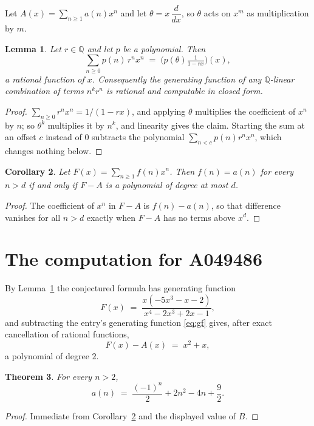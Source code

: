 \documentclass[11pt,a4paper]{article}
\theoremstyle{plain}
\newtheorem{theorem}{Theorem}
\newtheorem{lemma}[theorem]{Lemma}
\newtheorem{corollary}[theorem]{Corollary}
\theoremstyle{definition}
\begin{document}
Let $A(x)=\sum_{n\ge 1}a(n)x^{n}$ and let $\theta=x\,\dfrac{d}{dx}$, so $\theta$
acts on $x^{m}$ as multiplication by $m$.

\begin{lemma}\label{lem:gf}
Let $r\in\mathbb{Q}$ and let $p$ be a polynomial. Then
\[
\sum_{n\ge0}p(n)\,r^{n}x^{n}\;=\;\bigl(p(\theta)\tfrac{1}{1-rx}\bigr)(x),
\]
a rational function of $x$. Consequently the generating function of any
$\mathbb{Q}$-linear combination of terms $n^{k}r^{n}$ is rational and computable in
closed form.
\end{lemma}

\begin{proof}
$\sum_{n\ge0}r^{n}x^{n}=1/(1-rx)$, and applying $\theta$ multiplies the coefficient of
$x^{n}$ by $n$; so $\theta^{k}$ multiplies it by $n^{k}$, and linearity gives the claim.
Starting the sum at an offset $c$ instead of $0$ subtracts the polynomial
$\sum_{n<c}p(n)r^{n}x^{n}$, which changes nothing below.
\end{proof}

\begin{corollary}\label{cor:criterion}
Let $F(x)=\sum_{n\ge 1}f(n)x^{n}$. Then $f(n)=a(n)$ for every $n>d$ if and only
if $F-A$ is a polynomial of degree at most $d$.
\end{corollary}

\begin{proof}
The coefficient of $x^{n}$ in $F-A$ is $f(n)-a(n)$, so that difference vanishes for all
$n>d$ exactly when $F-A$ has no terms above $x^{d}$.
\end{proof}

\section{The computation for A049486}

By Lemma~\ref{lem:gf} the conjectured formula has generating function
\[
F(x)\;=\;\frac{x \left(- 5 x^{3} - x - 2\right)}{x^{4} - 2 x^{3} + 2 x - 1} ,
\]
and subtracting the entry's generating function \eqref{eq:gf} gives, after exact
cancellation of rational functions,
\[
F(x)-A(x)\;=\;x^{2} + x ,
\]
a polynomial of degree $2$.

\begin{theorem}
For every $n>2$,
\[
a(n)\;=\;\frac{\left(-1\right)^{n}}{2} + 2 n^{2} - 4 n + \frac{9}{2} .
\]
\end{theorem}

\begin{proof}
Immediate from Corollary~\ref{cor:criterion} and the displayed value of $B$.
\end{proof}
\end{document}
